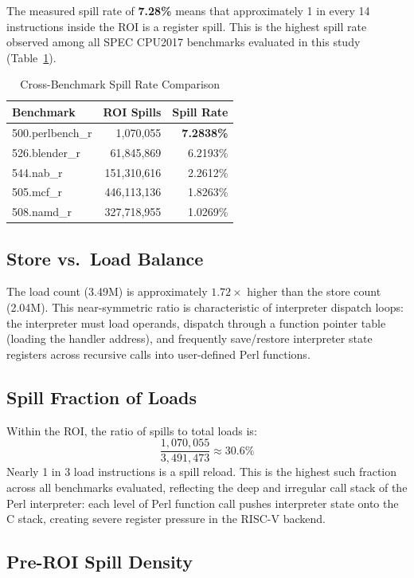 \documentclass[conference]{IEEEtran}
\begin{document}
The measured spill rate of \textbf{7.28\%} means that approximately
1 in every 14 instructions inside the ROI is a register spill.
This is the highest spill rate observed among all SPEC CPU2017
benchmarks evaluated in this study (Table~\ref{tab:compare}).

\begin{table}[H]
\centering
\caption{Cross-Benchmark Spill Rate Comparison}
\label{tab:compare}
\begin{tabular}{lrr}
\toprule
\textbf{Benchmark} & \textbf{ROI Spills} & \textbf{Spill Rate} \\
\midrule
500.perlbench\_r & 1,070,055   & \textbf{7.2838\%} \\
526.blender\_r   & 61,845,869  & 6.2193\% \\
544.nab\_r       & 151,310,616 & 2.2612\% \\
505.mcf\_r       & 446,113,136 & 1.8263\% \\
508.namd\_r      & 327,718,955 & 1.0269\% \\
\bottomrule
\end{tabular}
\end{table}

\subsection{Store vs.\ Load Balance}

The load count (3.49M) is approximately $1.72\times$ higher than the
store count (2.04M). This near-symmetric ratio is characteristic of
interpreter dispatch loops: the interpreter must load operands,
dispatch through a function pointer table (loading the handler
address), and frequently save/restore interpreter state registers
across recursive calls into user-defined Perl functions.

\subsection{Spill Fraction of Loads}

Within the ROI, the ratio of spills to total loads is:
\[
\frac{1{,}070{,}055}{3{,}491{,}473} \approx 30.6\%
\]
Nearly 1 in 3 load instructions is a spill reload. This is the
highest such fraction across all benchmarks evaluated, reflecting the
deep and irregular call stack of the Perl interpreter: each level of
Perl function call pushes interpreter state onto the C stack, creating
severe register pressure in the RISC-V backend.

\subsection{Pre-ROI Spill Density}
\end{document}
